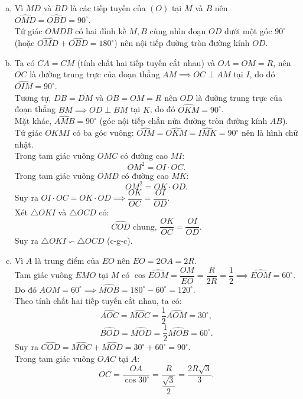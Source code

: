 \begin{bt}
{\begin{enumerate}[a)]
    \item Vì $MD$ và $BD$ là các tiếp tuyến của $(O)$ tại $M$ và $B$ nên $\widehat{OMD} = \widehat{OBD} = 90^\circ$.\\
    Tứ giác $OMDB$ có hai đỉnh kề $M, B$ cùng nhìn đoạn $OD$ dưới một góc $90^\circ$ (hoặc $\widehat{OMD} + \widehat{OBD} = 180^\circ$) nên nội tiếp đường tròn đường kính $OD$.
    \item Ta có $CA = CM$ (tính chất hai tiếp tuyến cắt nhau) và $OA = OM = R$, nên $OC$ là đường trung trực của đoạn thẳng $AM \implies OC \perp AM$ tại $I$, do đó $\widehat{OIM} = 90^\circ$.\\
    Tương tự, $DB = DM$ và $OB = OM = R$ nên $OD$ là đường trung trực của đoạn thẳng $BM \implies OD \perp BM$ tại $K$, do đó $\widehat{OKM} = 90^\circ$.\\
    Mặt khác, $\widehat{AMB} = 90^\circ$ (góc nội tiếp chắn nửa đường tròn đường kính $AB$).\\
    Tứ giác $OKMI$ có ba góc vuông: $\widehat{OIM} = \widehat{OKM} = \widehat{IMK} = 90^\circ$ nên là hình chữ nhật.\\
    Trong tam giác vuông $OMC$ có đường cao $MI$:
    $$OM^2 = OI \cdot OC.$$
    Trong tam giác vuông $OMD$ có đường cao $MK$:
    $$OM^2 = OK \cdot OD.$$
    Suy ra $OI \cdot OC = OK \cdot OD \implies \dfrac{OK}{OC} = \dfrac{OI}{OD}$.\\
    Xét $\triangle OKI$ và $\triangle OCD$ có:
    $$\widehat{COD}\text{ chung, } \dfrac{OK}{OC} = \dfrac{OI}{OD}.$$
    Suy ra $\triangle OKI \backsim \triangle OCD$ (c-g-c).
    \item Vì $A$ là trung điểm của $EO$ nên $EO = 2OA = 2R$.\\
    Tam giác vuông $EMO$ tại $M$ có $\cos \widehat{EOM} = \dfrac{OM}{EO} = \dfrac{R}{2R} = \dfrac{1}{2} \implies \widehat{EOM} = 60^\circ$.\\
    Do đó $\widehat{AOM} = 60^\circ \implies \widehat{MOB} = 180^\circ - 60^\circ = 120^\circ$.\\
    Theo tính chất hai tiếp tuyến cắt nhau, ta có:
    $$\widehat{AOC} = \widehat{MOC} = \dfrac{1}{2}\widehat{AOM} = 30^\circ,$$
    $$\widehat{BOD} = \widehat{MOD} = \dfrac{1}{2}\widehat{MOB} = 60^\circ.$$
    Suy ra $\widehat{COD} = \widehat{MOC} + \widehat{MOD} = 30^\circ + 60^\circ = 90^\circ$.\\
    Trong tam giác vuông $OAC$ tại $A$:
    $$OC = \dfrac{OA}{\cos 30^\circ} = \dfrac{R}{\dfrac{\sqrt{3}}{2}} = \dfrac{2R\sqrt{3}}{3}.$$

\end{enumerate}}
\end{bt}
